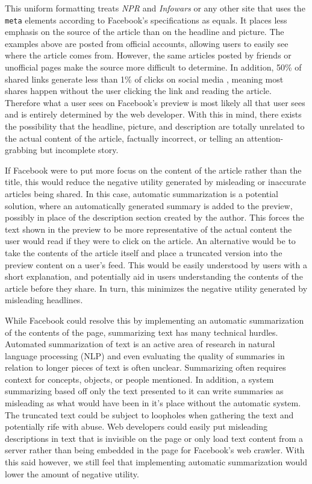 \documentclass[12pt]{article}
\begin{document}
This uniform formatting treats {\it NPR} and {\it Infowars} or any other site that uses the \texttt{meta} elements according to Facebook's specifications as equals. It places less emphasis on the source of the article than on the headline and picture. The examples above are posted from official accounts, allowing users to easily see where the article comes from. However, the same articles posted by friends or unofficial pages make the source more difficult to determine. In addition, 50\% of shared links generate less than 1\% of clicks on social media \citep{clicks_vs_shares}, meaning most shares happen without the user clicking the link and reading the article. Therefore what a user sees on Facebook's preview is most likely all that user sees and is entirely determined by the web developer. With this in mind, there exists the possibility that the headline, picture, and description are totally unrelated to the actual content of the article, factually incorrect, or telling an attention-grabbing but incomplete story.

If Facebook were to put more focus on the content of the article rather than the title, this would reduce the negative utility generated by misleading or inaccurate articles being shared. In this case, automatic summarization is a potential solution, where an automatically generated summary is added to the preview, possibly in place of the description section created by the author. This forces the text shown in the preview to be more representative of the actual content the user would read if they were to click on the article. An alternative would be to take the contents of the article itself and place a truncated version into the preview content on a user's feed. This would be easily understood by users with a short explanation, and potentially aid in users understanding the contents of the article before they share. In turn, this minimizes the negative utility generated by misleading headlines.

While Facebook could resolve this by implementing an automatic summarization of the contents of the page, summarizing text has many technical hurdles. Automated summarization of text is an active area of research in natural language processing (NLP) and even evaluating the quality of summaries in relation to longer pieces of text is often unclear. Summarizing often requires context for concepts, objects, or people mentioned. In addition, a system summarizing based off only the text presented to it can write summaries as misleading as what would have been in it's place without the automatic system. The truncated text could be subject to loopholes when gathering the text and potentially rife with abuse. Web developers could easily put misleading descriptions in text that is invisible on the page or only load text content from a server rather than being embedded in the page for Facebook's web crawler. With this said however, we still feel that implementing automatic summarization would lower the amount of negative utility. 
\end{document}
